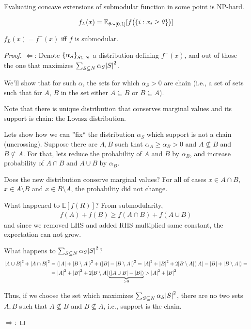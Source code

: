 \begin{prop}
	Evaluating concave extensions of submodular function in some point is NP-hard.
\end{prop}

\begin{definition}
	\begin{align}
	f_L(x) = \mathbb{E}_{\theta \sim [0,1]} [f\qty\big(\qty{i: x_i \geq \theta})]
	\end{align}
\end{definition}

\begin{theorem}[Lovasz]
	$f_L(x) = f^-(x)$ iff $f$ is submodular.
	\begin{proof}
		$\Leftarrow$:
		Denote $\qty{ \alpha_S}_{S\subseteq N}$ a distribution defining $f^-(x)$, and out of those the one that maximizes $\sum_{S \subseteq N} \alpha_S \abs{S}^2$.
		
		We'll show that for such $\alpha$, the sets for which $\alpha_S >0$ are chain (i.e., a set of sets such that for $A$, $B$ in the set either $A\subseteq B$ or $B\subseteq A$).
		
		Note that there is unique distribution that conserves marginal values and its support is chain: the Lovasz distribution. 
		
		Lets show how we can ''fix`` the distribution $\alpha_S$ which support is not a chain (uncrossing). Suppose there are $A,B$ such that $\alpha_A\geq \alpha_B >0$ and $A\not\subseteq B$ and  $B\not\subseteq A$.
		For that, lets reduce the probability of $A$ and $B$ by $\alpha_B$, and increase probability of $A\cap B$ and $A\cup B$ by $\alpha_B$.
		
		Does the new distribution conserve marginal values? For all of cases $x\in A\cap B$, $x\in A\setminus B$ and $x\in B\setminus A$, the probability did not change.
		
		What happened to $\mathbb{E} [f(R)]$? From submodularity,
		\begin{align}
		f(A) + f(B) \geq f(A\cap B) + f(A\cup B)
		\end{align}
		and since we removed LHS and added RHS multiplied same constant, the expectation can not grow.
		
		What happens to $\sum_{S \subseteq N} \alpha_S \abs{S}^2$?
		\begin{align}
		\abs{A\cup B}^2 + \abs{A\cap B}^2 &= \qty(\abs{A} + \abs{B\setminus A})^2 + \qty(\abs{B} - \abs{B\setminus A})^2 = \abs{A}^2+\abs{B}^2 + 2\abs{B\setminus A} \qty(\abs{A} - \abs{B} + \abs{B\setminus A}) =\\&= \abs{A}^2+\abs{B}^2 + 2\abs{B\setminus A}\underbrace{ \qty(\abs{A\cup B} - \abs{B})}_{>0} >  \abs{A}^2+\abs{B}^2
		\end{align}
		
		Thus, if we choose the set which maximizes $\sum_{S \subseteq N} \alpha_S \abs{S}^2$, there are no two sets $A,B$ such that $A\not\subseteq B$ and $B \not\subseteq A$, i.e., support is the chain.
		
		
		
		$\Rightarrow$:
	\end{proof}
\end{theorem}


